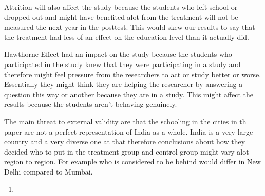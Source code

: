 \documentclass[
  12pt,
  landscape]{article}
\begin{document}
Attrition will also affect the study because the students who left
school or dropped out and might have benefited alot from the treatment
will not be measured the next year in the posttest. This would skew our
results to say that the treatment had less of an effect on the education
level than it actually did.

Hawthorne Effect had an impact on the study because the students who
participated in the study knew that they were participating in a study
and therefore might feel pressure from the researchers to act or study
better or worse. Essentially they might think they are helping the
researcher by answering a question this way or another because they are
in a study. This might affect the results because the students aren't
behaving genuinely.

The main threat to external validity are that the schooling in the
cities in th paper are not a perfect representation of India as a whole.
India is a very large country and a very diverse one at that therefore
conclusions about how they decided who to put in the treatment group and
control group might vary alot region to region. For example who is
considered to be behind would differ in New Delhi compared to Mumbai.

\begin{enumerate}
\def\labelenumi{(\alph{enumi})}
\setcounter{enumi}{6}
\item
\end{enumerate}
\end{document}

